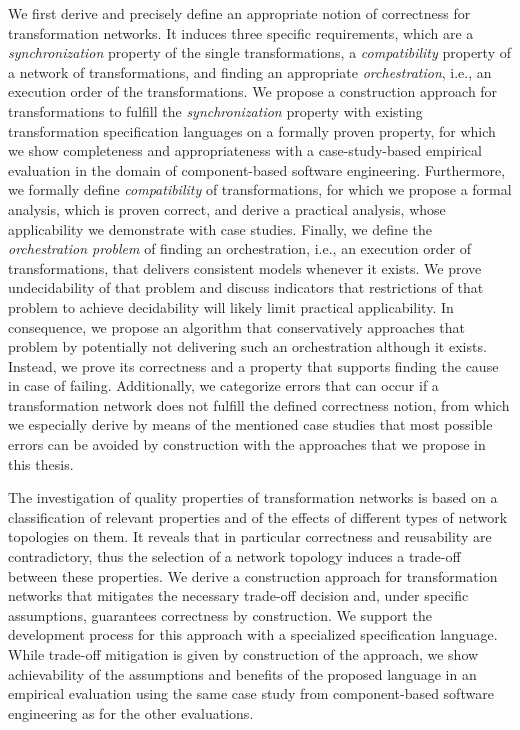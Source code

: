 We first derive and precisely define an appropriate notion of correctness for transformation networks.
It induces three specific requirements, which are a \emph{synchronization} property of the single transformations, a \emph{compatibility} property of a network of transformations, and finding an appropriate \emph{orchestration}, i.e., an execution order of the transformations.
We propose a construction approach for transformations to fulfill the \emph{synchronization} property with existing transformation specification languages on a formally proven property, for which we show completeness and appropriateness with a case-study-based empirical evaluation in the domain of component-based software engineering.
Furthermore, we formally define \emph{compatibility} of transformations, for which we propose a formal analysis, which is proven correct, and derive a practical analysis, whose applicability we demonstrate with case studies.
Finally, we define the \emph{orchestration problem} of finding an orchestration, i.e., an execution order of transformations, that delivers consistent models whenever it exists.
We prove undecidability of that problem and discuss indicators that restrictions of that problem to achieve decidability will likely limit practical applicability.
In consequence, we propose an algorithm that conservatively approaches that problem by potentially not delivering such an orchestration although it exists.
Instead, we prove its correctness and a property that supports finding the cause in case of failing.
Additionally, we categorize errors that can occur if a transformation network does not fulfill the defined correctness notion, from which we especially derive by means of the mentioned case studies that most possible errors can be avoided by construction with the approaches that we propose in this thesis.

The investigation of quality properties of transformation networks is based on a classification of relevant properties and of the effects of different types of network topologies on them.
It reveals that in particular correctness and reusability are contradictory, thus the selection of a network topology induces a trade-off between these properties.
We derive a construction approach for transformation networks that mitigates the necessary trade-off decision and, under specific assumptions, guarantees correctness by construction.
We support the development process for this approach with a specialized specification language.
While trade-off mitigation is given by construction of the approach, we show achievability of the assumptions and benefits of the proposed language in an empirical evaluation using the same case study from component-based software engineering as for the other evaluations.

